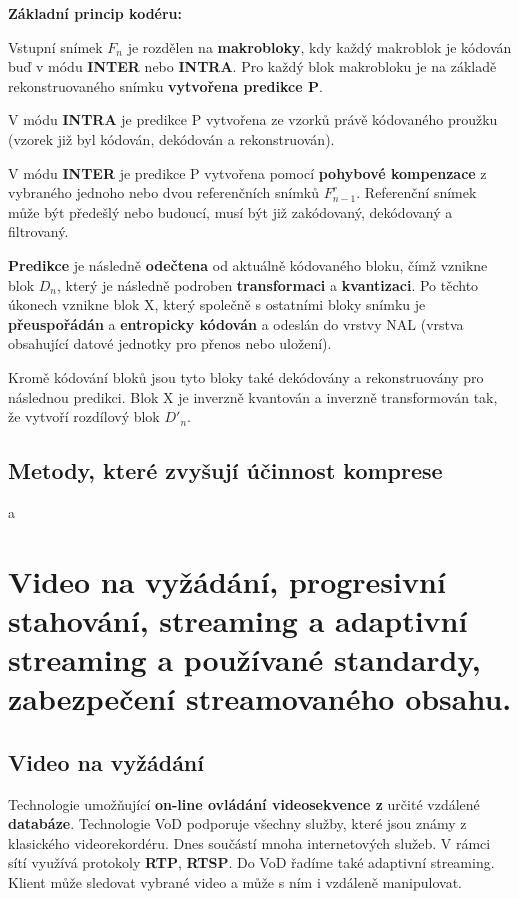 \textbf{Základní princip kodéru:}\vspace{-4mm}

Vstupní snímek $F_n$ je rozdělen na \textbf{makrobloky}, kdy každý makroblok je kódován buď v módu \textbf{INTER} nebo \textbf{INTRA}. Pro každý blok makrobloku je na základě rekonstruovaného snímku \textbf{vytvořena predikce P}.

V módu \textbf{INTRA} je predikce P vytvořena ze vzorků právě kódovaného proužku (vzorek již byl kódován, dekódován a rekonstruován).

V módu \textbf{INTER} je predikce P vytvořena pomocí \textbf{pohybové kompenzace} z vybraného jednoho nebo dvou referenčních snímků $F_{n-1}^r$. Referenční snímek může být předešlý nebo budoucí, musí být již zakódovaný, dekódovaný a filtrovaný.

\textbf{Predikce} je následně \textbf{odečtena} od aktuálně kódovaného bloku, čímž vznikne blok $D_n$, který je následně podroben \textbf{transformaci} a \textbf{kvantizaci}. Po těchto úkonech vznikne blok X, který společně s ostatními bloky snímku je \textbf{přeuspořádán} a \textbf{entropicky kódován} a odeslán do vrstvy NAL (vrstva obsahující datové jednotky pro přenos nebo uložení).

Kromě kódování bloků jsou tyto bloky také dekódovány a rekonstruovány pro následnou predikci. Blok X je inverzně kvantován a inverzně transformován tak, že vytvoří rozdílový blok $D'_n$.


\subsection{Metody, které zvyšují účinnost komprese}

a


\section{Video na vyžádání, progresivní stahování, streaming a adaptivní streaming a používané standardy, zabezpečení streamovaného obsahu.}

\subsection{Video na vyžádání}

Technologie umožňující \textbf{on-line ovládání videosekvence z} určité vzdálené \textbf{databáze}. Technologie VoD podporuje všechny služby, které jsou známy z klasického videorekordéru. Dnes součástí mnoha internetových služeb. V rámci sítí využívá protokoly \textbf{RTP}, \textbf{RTSP}. Do VoD řadíme také adaptivní streaming. Klient může sledovat vybrané video a může s ním i vzdáleně manipulovat.

